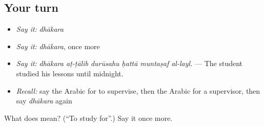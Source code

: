 \subsection*{Your turn}
\begin{itemize}
\raggedright
  \item \emph{Say it:} \emph{dhākara}
  \item \emph{Say it:} \emph{dhākara}, once more
  \item \emph{Say it:} \emph{dhākara aṭ-ṭālib durūsahu ḥattā muntaṣaf al-layl.} — The student studied his lessons until midnight.
  \item \emph{Recall:} say the Arabic for to supervise, then the Arabic for a supervisor, then say \emph{dhākara} again
\end{itemize}

\begin{tcolorbox}[breakable,colback=teal!4,colframe=teal!35!black,title={Before you move on}]
What does  mean? (\textquotedblleft{}To study for\textquotedblright{}.) Say it once more.
\end{tcolorbox}
